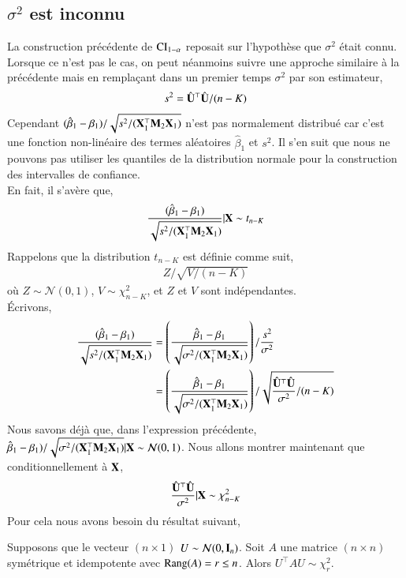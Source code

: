 \documentclass[10pt, reqno]{amsart}
\begin{document}
\subsection{$\sigma^2$ est inconnu}
La construction précédente de $\mathrm{CI}_{1-\alpha}$ reposait sur l'hypothèse que $\sigma^2$ était connu. Lorsque ce n'est pas le cas, on peut néanmoins suivre une approche similaire à la précédente mais en remplaçant dans un premier temps $\sigma^2$ par son estimateur,
\begin{align*}
s^2 = \hat{\mathbf U}^\top \hat{\mathbf U}/(n-K)
\end{align*}
Cependant $(\hat{\beta}_1-\beta_1)/
\sqrt{s^2/(\mathbf X_1^\top\mathbf M_2\mathbf X_1)}$ n'est pas normalement distribué car c'est une fonction non-linéaire des termes aléatoires $\hat{\beta}_1$ et $s^2$. Il s'en suit que nous ne pouvons pas utiliser les quantiles de la distribution normale pour la construction des intervalles de confiance.\\
En fait, il s'avère que,
\begin{align}
\frac{(\hat{\beta} _1-\beta_1)}{\sqrt{s^2/(\mathbf X_1^\top\mathbf M_2\mathbf X_1)}}
| \mathbf X
\sim t_{n-K}
\label{eq22}
\end{align}
Rappelons que la	 distribution $t_{n-K}$ est définie comme suit,
\begin{align*}
Z/\sqrt{V/(n-K)}
\end{align*}
où $Z\sim \mathcal{N}(0,1)$, $V\sim \chi^2_{n-K}$, et $Z$ et $V$ sont indépendantes.\\ \'Ecrivons,
\begin{align}
\frac{(\hat{\beta}_1-\beta_1)}{\sqrt{s^2/(\mathbf X_1^\top\mathbf M_2\mathbf X_1)}}
&= \left(
\frac{\hat{\beta}_1-\beta_1}{\sqrt{\sigma^2/(\mathbf X_1^\top\mathbf M_2\mathbf X_1)}}
\right)/
\frac{s^2}{\sigma^2}\nonumber \\
&= 
 \left(
\frac{\hat{\beta}_1-\beta_1}{\sqrt{\sigma^2/(\mathbf X_1^\top\mathbf M_2\mathbf X_1)}}
\right)/
\sqrt{\frac{\hat{\mathbf U}^\top\hat{\mathbf U}}{\sigma^2}/(n-K)}
\label{eq32}
\end{align}
Nous savons déjà que, dans l'expression précédente, $\hat{\beta} _1-\beta_1)/\sqrt{\sigma^2/(\mathbf X_1^\top\mathbf M_2\mathbf X_1)} |\mathbf X \sim \mathcal{N}(0,1)$. Nous allons montrer maintenant que conditionnellement à $\mathbf X$,
\begin{align}
\frac{\hat{\mathbf U}^\top\hat{\mathbf U}}{\sigma^2} | \mathbf X\sim\chi^2_{n-K}
\label{eq23}
\end{align}
Pour cela nous avons besoin du résultat suivant,
\begin{lemme}
Supposons que le vecteur $(n\times 1)$ $U\sim\mathcal{N}(0, \mathbf{I}_n)$. Soit $A$ une matrice $(n\times n)$ symétrique et idempotente avec $\mathrm{Rang}(A) = r \leq n$. Alors $U^\top A U \sim \chi^2_r$.
\label{le1}
\end{lemme}
\end{document}
